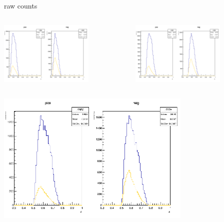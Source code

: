 \begin{frame}{raw counts}
\begin{columns}
\begin{column}[T]{0.5\textwidth}
\includegraphics[width = 0.7\textwidth]{results/yield/statistics/counts_x_Q2_z_0.45_4.750_0.40.png}
\end{column}
\begin{column}[T]{0.5\textwidth}
\includegraphics[width = 0.7\textwidth]{results/yield/statistics/counts_x_Q2_z_0.45_4.750_0.50.png}
\end{column}
\end{columns}
\begin{columns}
\begin{column}[T]{0.5\textwidth}
\includegraphics[width = 0.7\textwidth]{results/yield/statistics/counts_x_Q2_z_0.45_4.750_0.60.png}

\end{column}
\end{columns}
\end{frame}
